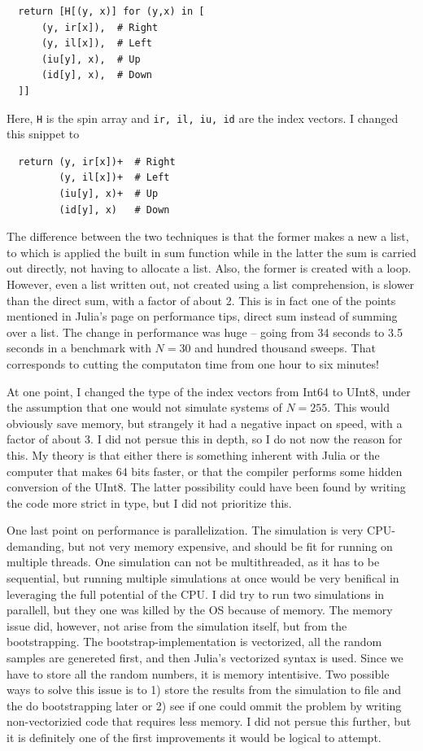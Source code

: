 \documentclass{article}
\begin{document}
\begin{lstlisting}
  return [H[(y, x)] for (y,x) in [
      (y, ir[x]),  # Right
      (y, il[x]),  # Left
      (iu[y], x),  # Up
      (id[y], x),  # Down
  ]]
\end{lstlisting}
Here, \verb|H| is the spin array and \verb|ir, il, iu, id| are the index vectors.
I changed this snippet to
\begin{lstlisting}
  return (y, ir[x])+  # Right
         (y, il[x])+  # Left
         (iu[y], x)+  # Up
         (id[y], x)   # Down
\end{lstlisting}
The difference between the two techniques is that the former makes a new a list, to which is applied the built in sum function while in the latter the sum is carried out directly, not having to allocate a list.
Also, the former is created with a loop.
However, even a list written out, not created using a list comprehension, is slower than the direct sum, with a factor of about 2.
This is in fact one of the points mentioned in Julia's page on performance tips, direct sum instead of summing over a list.
The change in performance was huge -- going from 34 seconds to 3.5 seconds in a benchmark with $N=30$ and hundred thousand sweeps.
That corresponds to cutting the computaton time from one hour to six minutes!

At one point, I changed the type of the index vectors from Int64 to UInt8, under the assumption that one would not simulate systems of $N=255$.
This would obviously save memory, but strangely it had a negative inpact on speed, with a factor of about 3.
I did not persue this in depth, so I do not now the reason for this.
My theory is that either there is something inherent with Julia or the computer that makes 64 bits faster, or that the compiler performs some hidden conversion of the UInt8.
The latter possibility could have been found by writing the code more strict in type, but I did not prioritize this.


One last point on performance is parallelization.
The simulation is very CPU-demanding, but not very memory expensive, and should be fit for running on multiple threads.
One simulation can not be multithreaded, as it has to be sequential, but running multiple simulations at once would be very benifical in leveraging the full potential of the CPU.
I did try to run two simulations in parallell, but they one was killed by the OS because of memory.
The memory issue did, however, not arise from the simulation itself, but from the bootstrapping.
The bootstrap-implementation is vectorized, all the random samples are genereted first, and then Julia's vectorized syntax is used.
Since we have to store all the random numbers, it is memory intentisive.
Two possible ways to solve this issue is to 1) store the results from the simulation to file and the do bootstrapping later or 2) see if one could ommit the problem by writing non-vectorizied code that requires less memory.
I did not persue this further, but it is definitely one of the first improvements it would be logical to attempt.
\end{document}
